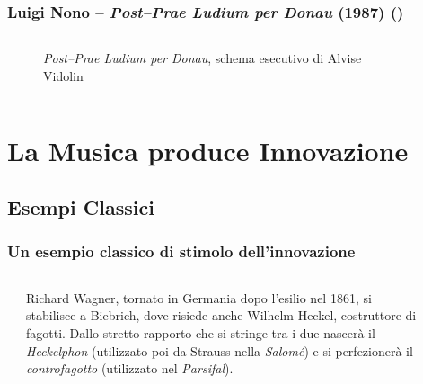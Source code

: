 \documentclass[compress]{beamer}
\newcommand{\esdplay}[2]{\href{run: play -q \exampledir/#1}{#2 \pgfuseimage{speaker}}}
\begin{document}
\begin{frame}
    \frametitle{\normalsize Luigi Nono -- \emph{Post--Prae Ludium per Donau} (1987) ()} 

    \begin{columns}
        \begin{column}{0.9\textwidth}
            \vspace{-0.6cm}
            \begin{figure}
                \caption{\emph{Post--Prae Ludium per Donau}, schema esecutivo di Alvise Vidolin}
            \end{figure}
        \end{column}
        \begin{column}{0.1\textwidth}
            \esdplay{Delay4_A_misto_rotto_Rev.wav}{}
        \end{column}
    \end{columns}

\end{frame}

\section[Musica $\Rightarrow$ Innovazione]{La Musica produce Innovazione}

\subsection[Classici]{Esempi Classici}

\begin{frame}
    \frametitle{Un esempio classico di stimolo dell'innovazione}

    \begin{columns}[T]
        \begin{column}{0.2\textwidth}
        \end{column}
        \begin{column}{0.5\textwidth}
            Richard Wagner, tornato in Germania dopo l'esilio nel 1861, si
            stabilisce a Biebrich, dove risiede anche Wilhelm Heckel,
            costruttore di fagotti. Dallo stretto rapporto che si stringe tra i due
            nascer\`a il \emph{Heckelphon} (utilizzato poi da Strauss nella
            \emph{Salom\'e}) e si perfezioner\`a il \emph{controfagotto} (utilizzato nel
            \emph{Parsifal}).
        \end{column}
        \begin{column}{0.05\textwidth}
        \end{column}
        \begin{column}{0.1\textwidth}
        \end{column}
    \end{columns}
\end{frame}
\end{document}
